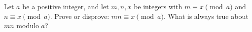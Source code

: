 Let $a$ be a positive integer, and let $m,n,x$ be integers with $m\equiv x\pmod a$ and $n\equiv x\pmod a$. Prove or disprove: $mn\equiv x\pmod a$. What is always true about $mn$ modulo $a$?
